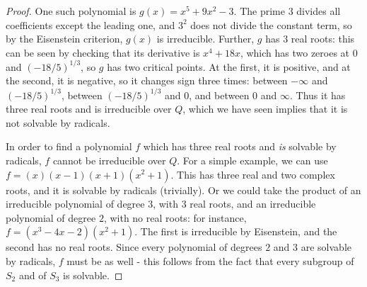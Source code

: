 \documentclass[12pt]{article}
\theoremstyle{definition}
\newenvironment{problem}[2][Problem]{\begin{trivlist}
\item[\hskip \labelsep {\bfseries #1}\hskip \labelsep {\bfseries #2.}]}{\end{trivlist}}
\begin{document}
\begin{problem}{7}
\begin{proof}
		\par One such polynomial is $g(x) = x^5 + 9x^2 - 3$. The prime $3$ divides all coefficients except the leading one, and $3^2$ does not divide the constant term, so by the Eisenstein criterion, $g(x)$ is irreducible. Further, $g$ has $3$ real roots: this can be seen by checking that its derivative is $x^4 + 18x$, which has two zeroes at $0$ and $(-18/5)^{1/3}$, so $g$ has two critical points. At the first, it is positive, and at the second, it is negative, so it changes sign three times: between $-\infty$ and $(-18/5)^{1/3}$, between $(-18/5)^{1/3}$ and $0$, and between $0 $ and $\infty$. Thus it has three real roots and is irreducible over $Q$, which we have seen implies that it is not solvable by radicals.
	\par In order to find a polynomial $f$ which has three real roots and \textit{is} solvable by radicals, $f$ cannot be irreducible over $Q$. For a simple example, we can use $f = (x)(x-1)(x+1)(x^2 + 1)$. This has three real and two complex roots, and it is solvable by radicals (trivially). Or we could take the product of an irreducible polynomial of degree $3$, with $3$ real roots, and an irreducible polynomial of degree $2$, with no real roots: for instance, $f = (x^3 - 4x - 2)(x^2 + 1)$. The first is irreducible by Eisenstein, and the second has no real roots. Since every polynomial of degrees $2$ and  $3$ are solvable by radicals, $f$ must be as well - this follows from the fact that every subgroup of $S_2$ and of $S_3$ is solvable.
	\end{proof}
\end{problem}
\end{document}

